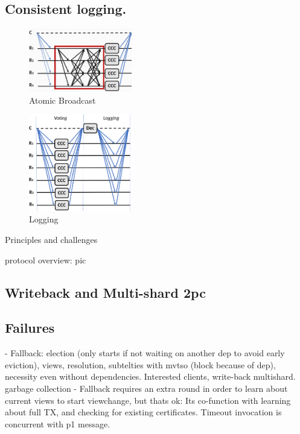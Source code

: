 \subsection{Consistent logging.}
\begin{figure}
\begin{center}
\includegraphics[width= 0.4\textwidth]{./figures/AB.png}
\end{center}
\caption{Atomic Broadcast}
\label{fig:Figure1}
\end{figure}


\begin{figure}
\begin{center}
\includegraphics[width= 0.4\textwidth]{./figures/5f+1.png}
\end{center}
\caption{Logging}
\label{fig:Figure1}
\end{figure}

Principles and challenges

protocol overview: pic


\subsection{Writeback and Multi-shard 2pc}

\subsection{Failures}
- Fallback: election (only starts if not waiting on another dep to avoid early eviction), views, resolution, subtelties with mvtso (block because of dep), necessity even without dependencies. Interested clients, write-back multishard. garbage collection
- Fallback requires an extra round in order to learn about current views to start viewchange, but thats ok: Its co-function with learning about full TX, and checking for existing certificates. Timeout invocation is concurrent with p1 message.

